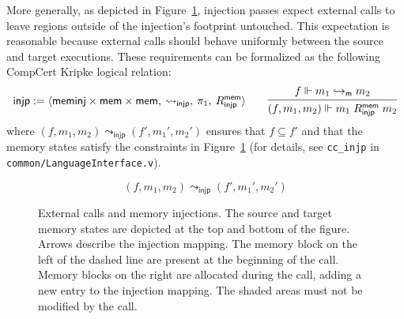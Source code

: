 \documentclass[11pt,oneside,draft]{book}
\theoremstyle{definition}
\newcommand{\kw}[1]{\ensuremath{ \mathsf{#1} }}
\begin{document}
More generally,
as depicted in Figure~\ref{fig:injp},
injection passes expect external calls
to leave regions outside of the injection's footprint untouched.
This expectation is reasonable because
external calls
should behave uniformly between the source and target executions.
These requirements can be formalized as the
following CompCert Kripke logical relation:
\[
  \kw{injp} :=
    \langle
      \kw{meminj} \times \kw{mem} \times \kw{mem}, \:
      {\leadsto_\kw{injp}}, \:
      \pi_1, \:
      R^\kw{mem}_\kw{injp}
    \rangle
  \qquad
  \begin{prooftree}
    \hypo{f \Vdash m_1 \hookrightarrow_\kw{m} m_2}
    \infer1{(f, m_1, m_2) \Vdash m_1 \mathrel{R^\kw{mem}_\kw{injp}} m_2}
  \end{prooftree}
\]
where $(f, m_1, m_2) \leadsto_\kw{injp} (f', m_1', m_2')$
ensures that $f \subseteq f'$ and that the memory states
satisfy the constraints in Figure~\ref{fig:injp}
(for details,
see \texttt{cc\_injp} in \texttt{common/LanguageInterface.v}).

\begin{figure} %
  \centering
  \[ (f, m_1, m_2) \leadsto_\kw{injp} (f', m_1', m_2') \]
  \caption[External calls and memory injections]%
   {External calls and memory injections.
    The source and target memory states are
    depicted at the top and bottom
    of the figure. Arrows describe the injection mapping.
    The memory block on the left of the dashed line
    are present at the beginning of the call.
    Memory blocks on the right
    are allocated during the call,
    adding a new entry to the injection mapping.
    The shaded areas must not be modified by the call.
  }
  \label{fig:injp}
\end{figure}
\end{document}
